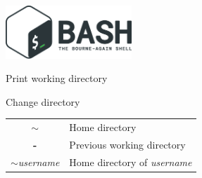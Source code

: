 \documentclass[12pt, a4paper]
{article}
\begin{document}
\pagestyle{empty}

\begin{center}
	 \hspace{1em}  \includegraphics[height=2cm]{bash_the_bourne_again_shell}
\end{center}
\vspace{0.25em}

\begin{multicols}{3}


\begin{description}[nolistsep]
	\item[pwd] Print working directory
	\item[cd] Change directory 
	\item
	\begin{tabular}{cl}
		{\large \ttfamily \textbf{$\sim$}} & Home directory \\
		{\large \ttfamily \textbf{-}} & Previous working directory \\
		{\large \ttfamily \textbf{$\sim$}\textit{username}} & Home directory of \textit{username}
	\end{tabular}
\end{description}




\end{multicols}
\end{document}
